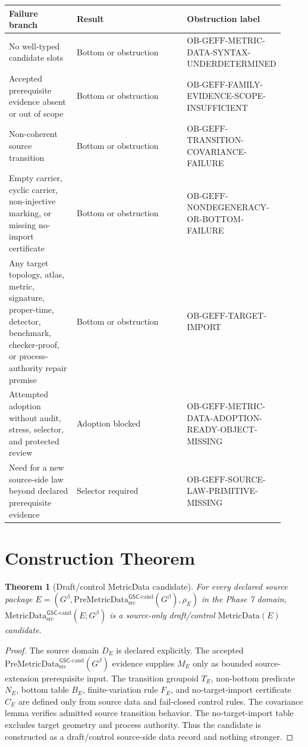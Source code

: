 \documentclass[11pt]{article}
\newcommand{\PreMetricData}{\mathrm{PreMetricData}_{\mathrm{src}}^{\mathsf{GSC}\mbox{-}\mathrm{cand}}}
\newcommand{\MetricData}{\mathrm{MetricData}_{\mathrm{src}}^{\mathsf{GSC}\mbox{-}\mathrm{cand}}}
\newcommand{\Gbeta}{G^\beta}
\newcommand{\OBGEFF}{\mathrm{OB\mbox{-}GEFF}}
\newtheorem{theorem}{Theorem}
\begin{document}
\begin{longtable}{p{0.26\linewidth}p{0.45\linewidth}p{0.21\linewidth}}
\toprule
Failure branch & Result & Obstruction label \\
\midrule
No well-typed candidate slots & Bottom or obstruction & \(\OBGEFF\)-METRIC-DATA-SYNTAX-UNDERDETERMINED \\
Accepted prerequisite evidence absent or out of scope & Bottom or obstruction & \(\OBGEFF\)-FAMILY-EVIDENCE-SCOPE-INSUFFICIENT \\
Non-coherent source transition & Bottom or obstruction & \(\OBGEFF\)-TRANSITION-COVARIANCE-FAILURE \\
Empty carrier, cyclic carrier, non-injective marking, or missing no-import
certificate & Bottom or obstruction & \(\OBGEFF\)-NONDEGENERACY-OR-BOTTOM-FAILURE \\
Any target topology, atlas, metric, signature, proper-time, detector, benchmark,
checker-proof, or process-authority repair premise & Bottom or obstruction & \(\OBGEFF\)-TARGET-IMPORT \\
Attempted adoption without audit, stress, selector, and protected review & Adoption blocked & \(\OBGEFF\)-METRIC-DATA-ADOPTION-READY-OBJECT-MISSING \\
Need for a new source-side law beyond declared prerequisite evidence & Selector required & \(\OBGEFF\)-SOURCE-LAW-PRIMITIVE-MISSING \\
\bottomrule
\end{longtable}

\section{Construction Theorem}

\begin{theorem}[Draft/control MetricData candidate]
For every declared source package \(E=(\Gbeta,\PreMetricData(\Gbeta),\rho_E)\)
in the Phase 7 domain, \(\MetricData(E;\Gbeta)\) is a source-only
draft/control \(\mathrm{MetricData}(E)\) candidate.
\end{theorem}

\begin{proof}
The source domain \(D_E\) is declared explicitly. The accepted
\(\PreMetricData(\Gbeta)\) evidence supplies \(M_E\) only as bounded
source-extension prerequisite input. The transition groupoid \(T_E\), non-bottom
predicate \(N_E\), bottom table \(B_E\), finite-variation rule \(F_E\), and
no-target-import certificate \(C_E\) are defined only from source data and
fail-closed control rules. The covariance lemma verifies admitted source
transition behavior. The no-target-import table excludes target geometry and
process authority. Thus the candidate is constructed as a draft/control
source-side data record and nothing stronger.
\end{proof}
\end{document}
